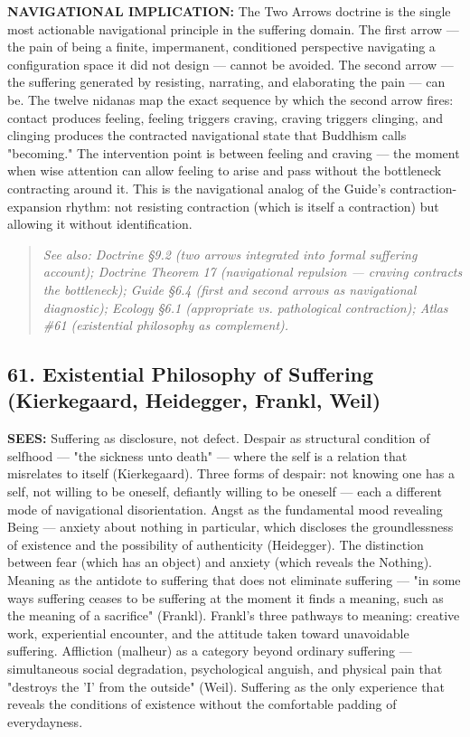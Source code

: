 \textbf{NAVIGATIONAL IMPLICATION:} The Two Arrows doctrine is the single most actionable navigational principle in the suffering domain. The first arrow — the pain of being a finite, impermanent, conditioned perspective navigating a configuration space it did not design — cannot be avoided. The second arrow — the suffering generated by resisting, narrating, and elaborating the pain — can be. The twelve nidanas map the exact sequence by which the second arrow fires: contact produces feeling, feeling triggers craving, craving triggers clinging, and clinging produces the contracted navigational state that Buddhism calls "becoming." The intervention point is between feeling and craving — the moment when wise attention can allow feeling to arise and pass without the bottleneck contracting around it. This is the navigational analog of the Guide's contraction-expansion rhythm: not resisting contraction (which is itself a contraction) but allowing it without identification.


\begin{quote}
\itshape
\textit{See also: Doctrine §9.2 (two arrows integrated into formal suffering account); Doctrine Theorem 17 (navigational repulsion — craving contracts the bottleneck); Guide §6.4 (first and second arrows as navigational diagnostic); Ecology §6.1 (appropriate vs. pathological contraction); Atlas \#61 (existential philosophy as complement).}
\end{quote}


\bigskip\noindent\makebox[\textwidth]{\color{rulegray}\rule{5cm}{0.3pt}}\bigskip


\subsection*{61. Existential Philosophy of Suffering (Kierkegaard, Heidegger, Frankl, Weil)}


\textbf{SEES:} Suffering as disclosure, not defect. Despair as structural condition of selfhood — "the sickness unto death" — where the self is a relation that misrelates to itself (Kierkegaard). Three forms of despair: not knowing one has a self, not willing to be oneself, defiantly willing to be oneself — each a different mode of navigational disorientation. Angst as the fundamental mood revealing Being — anxiety about nothing in particular, which discloses the groundlessness of existence and the possibility of authenticity (Heidegger). The distinction between fear (which has an object) and anxiety (which reveals the Nothing). Meaning as the antidote to suffering that does not eliminate suffering — "in some ways suffering ceases to be suffering at the moment it finds a meaning, such as the meaning of a sacrifice" (Frankl). Frankl's three pathways to meaning: creative work, experiential encounter, and the attitude taken toward unavoidable suffering. Affliction (malheur) as a category beyond ordinary suffering — simultaneous social degradation, psychological anguish, and physical pain that "destroys the 'I' from the outside" (Weil). Suffering as the only experience that reveals the conditions of existence without the comfortable padding of everydayness.


